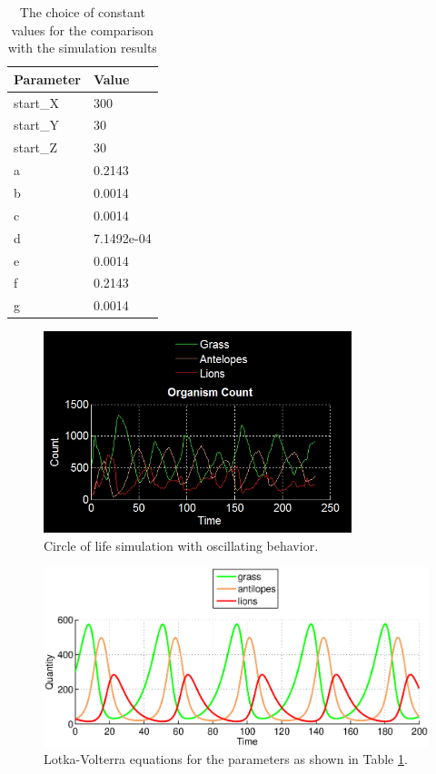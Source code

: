 \documentclass[11pt]{article}
\begin{document}
\begin{table}[htbp]
\centering
\begin{tabular}{l|l}
Parameter & Value \\ 
\hline 
\hline
start\_X & 300\\
\hline
start\_Y & 30\\
\hline
start\_Z & 30\\
\hline
a & 0.2143\\ 
\hline 
b & 0.0014\\ 
\hline 
c & 0.0014\\  
\hline 
d & 7.1492e-04\\
\hline 
e & 0.0014\\
\hline 
f & 0.2143\\
\hline 
g & 0.0014\\
\end{tabular}
\caption{The choice of constant values for the comparison with the simulation results}
\label{tab:LotkaVolterraParametersFinal}
\end{table}

\begin{figure}
\centering
\includegraphics[width=0.8\textwidth]{circleOfLifeOscillating.png}
\caption{Circle of life simulation with oscillating behavior.}
\label{fig:CircleOfLifeOscillating}
\end{figure}
\begin{figure}
\centering
\includegraphics[scale=0.7]{LotkaVolterraThreeAdjusted}
\caption{Lotka-Volterra equations for the parameters as shown in Table \ref{tab:LotkaVolterraParametersFinal}.}
\label{fig:LotkaVolterraThreeAdjusted}
\end{figure}
\end{document}
